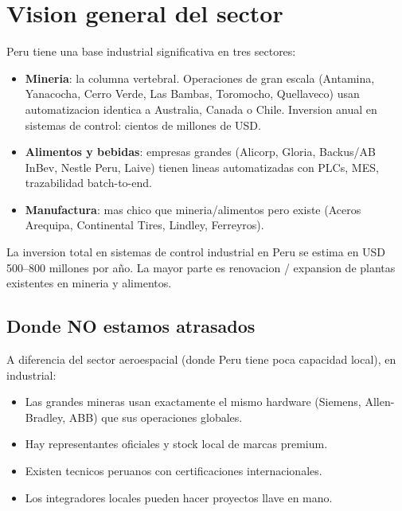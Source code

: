 \documentclass[11pt,a4paper,oneside]{report}
\begin{document}
\tableofcontents
\clearpage

\chapter{Vision general del sector}

Peru tiene una base industrial significativa en tres sectores:

\begin{itemize}[leftmargin=2em]
  \item \textbf{Mineria}: la columna vertebral. Operaciones de gran escala
        (Antamina, Yanacocha, Cerro Verde, Las Bambas, Toromocho, Quellaveco)
        usan automatizacion identica a Australia, Canada o Chile. Inversion
        anual en sistemas de control: cientos de millones de USD.
  \item \textbf{Alimentos y bebidas}: empresas grandes (Alicorp, Gloria,
        Backus/AB InBev, Nestle Peru, Laive) tienen lineas automatizadas
        con PLCs, MES, trazabilidad batch-to-end.
  \item \textbf{Manufactura}: mas chico que mineria/alimentos pero existe
        (Aceros Arequipa, Continental Tires, Lindley, Ferreyros).
\end{itemize}

\begin{datos}
La inversion total en sistemas de control industrial en Peru se estima
en USD 500--800 millones por año. La mayor parte es renovacion / expansion
de plantas existentes en mineria y alimentos.
\end{datos}

\section{Donde NO estamos atrasados}

A diferencia del sector aeroespacial (donde Peru tiene poca capacidad
local), en industrial:

\begin{itemize}[leftmargin=2em]
  \item Las grandes mineras usan exactamente el mismo hardware
        (Siemens, Allen-Bradley, ABB) que sus operaciones globales.
  \item Hay representantes oficiales y stock local de marcas premium.
  \item Existen tecnicos peruanos con certificaciones internacionales.
  \item Los integradores locales pueden hacer proyectos llave en mano.
\end{itemize}
\end{document}

